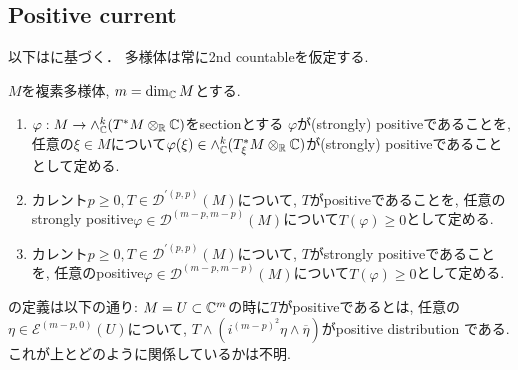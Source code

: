 \subsection{Positive current}
以下は\cite[Ch.3]{Dem}に基づく．
多様体は常に2nd countableを仮定する. 



\begin{tcolorbox}[mybox]
\begin{defn}
\label{defn-M-6.4.5}
$M$を複素多様体, $m=\dim_{\mathbb{C}} M$とする.
\begin{enumerate}
\item $\varphi : M \to \wedge_{\mathbb{C}}^{k}(T^{*}M \otimes_{\mathbb{R}} \mathbb{C})$をsectionとする
$\varphi$が(strongly) positiveであることを, 
任意の$\xi \in M$について$\varphi(\xi) \in\wedge_{\mathbb{C}}^{k}(T^{*}_{\xi}M \otimes_{\mathbb{R}} \mathbb{C})$が(strongly) positiveであることとして定める. 
\item カレント$p \ge 0, T \in \mathcal{D}^{'(p,p)}(M)$について, 
$T$がpositiveであることを, 任意のstrongly positive$\varphi \in  \mathcal{D}^{(m-p,m-p)}(M)$について$T(\varphi) \ge 0$として定める. 
\item カレント$p \ge 0, T \in \mathcal{D}^{'(p,p)}(M)$について, 
$T$がstrongly positiveであることを, 任意のpositive$\varphi \in  \mathcal{D}^{(m-p,m-p)}(M)$について$T(\varphi) \ge 0$として定める. 
\end{enumerate}
\end{defn}
\end{tcolorbox}

\begin{rem}
\cite{NO}の定義は以下の通り:
$M=U \subset \mathbb{C}^m$の時に$T$がpositiveであるとは, 任意の$\eta \in \mathcal{E}^{(m-p, 0)}(U)$について, 
$T \wedge (i^{(m-p)^2} \eta \wedge \overline{\eta})$がpositive distribution である. 
これが上とどのように関係しているかは不明. 
\end{rem}



